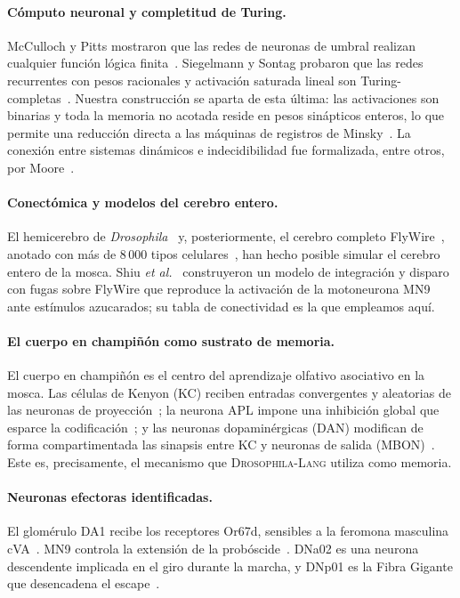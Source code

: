 \documentclass[11pt,a4paper]{article}
\theoremstyle{plain}
\theoremstyle{definition}
\theoremstyle{remark}
\newcommand{\dros}{\textup{\textsc{Drosophila-Lang}}}
\begin{document}
\paragraph{Cómputo neuronal y completitud de Turing.} McCulloch y Pitts
mostraron que las redes de neuronas de umbral realizan cualquier función
lógica finita~\cite{mcculloch1943}. Siegelmann y Sontag probaron que las redes
recurrentes con pesos racionales y activación saturada lineal son
Turing-completas~\cite{siegelmann1995}. Nuestra construcción se aparta de esta
última: las activaciones son binarias y toda la memoria no acotada reside en
pesos sinápticos enteros, lo que permite una reducción directa a las máquinas
de registros de Minsky~\cite{minsky1967}. La conexión entre sistemas dinámicos
e indecidibilidad fue formalizada, entre otros, por Moore~\cite{moore1990}.

\paragraph{Conectómica y modelos del cerebro entero.} El hemicerebro de
\textit{Drosophila}~\cite{scheffer2020} y, posteriormente, el cerebro completo
FlyWire~\cite{dorkenwald2024}, anotado con más de 8\,000 tipos
celulares~\cite{schlegel2024}, han hecho posible simular el cerebro entero
de la mosca. Shiu \emph{et al.}~\cite{shiu2024} construyeron un modelo de
integración y disparo con fugas sobre FlyWire que reproduce la activación de
la motoneurona MN9 ante estímulos azucarados; su tabla de conectividad es la
que empleamos aquí.

\paragraph{El cuerpo en champiñón como sustrato de memoria.} El cuerpo en
champiñón es el centro del aprendizaje olfativo asociativo en la mosca. Las
células de Kenyon (KC) reciben entradas convergentes y aleatorias de las
neuronas de proyección~\cite{caron2013}; la neurona APL impone una
inhibición global que esparce la codificación~\cite{lin2014}; y las neuronas
dopaminérgicas (DAN) modifican de forma compartimentada las sinapsis entre
KC y neuronas de salida (MBON)~\cite{aso2014,cohn2015,hige2015}. Este es,
precisamente, el mecanismo que \dros{} utiliza como memoria.

\paragraph{Neuronas efectoras identificadas.} El glomérulo DA1 recibe los
receptores Or67d, sensibles a la feromona masculina cVA~\cite{kurtovic2007}.
MN9 controla la extensión de la probóscide~\cite{gordon2009}. DNa02 es una
neurona descendente implicada en el giro durante la marcha, y DNp01 es la
Fibra Gigante que desencadena el escape~\cite{namiki2018,allen2006}.
\end{document}
